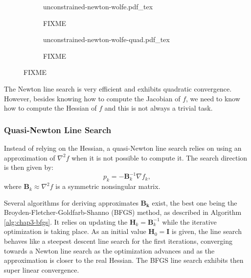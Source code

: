 \begin{figure}
  \centering
  \begin{subfigure}{0.4\columnwidth}
    \centering
        {\def\svgwidth{\linewidth}
          {\footnotesize
            
                       {unconstrained-newton-wolfe.pdf_tex}
          }
        }
        \caption{FIXME}
        \label{fig:chap3-unconstrained-newton-wolfe-a}
  \end{subfigure}
  \begin{subfigure}{0.4\columnwidth}
    \centering
        {\def\svgwidth{\linewidth}
          {\footnotesize
            
                       {unconstrained-newton-wolfe-quad.pdf_tex}
          }
        }
        \caption{FIXME}
        \label{fig:chap3-unconstrained-newton-wolfe-quad}
  \end{subfigure}
  \caption{FIXME}
  \label{fig:chap3-unconstrained-newton-wolfe}
\end{figure}

The Newton line search is very efficient and exhibits quadratic
convergence. However, besides knowing how to compute the Jacobian of
$f$, we need to know how to compute the Hessian of $f$ and this is not
always a trivial task.

\subsubsection{Quasi-Newton Line Search}
\label{subsubsec:chap3-quasi-newton-line-search}

Instead of relying on the Hessian, a quasi-Newton line search relies
on using an approximation of $\nabla^2 f$ when it is not possible to
compute it. The search direction is then given by:
\begin{equation}
p_k=-\mathbf{B}_k^{-1}\nabla f_k,
\end{equation}
where $\mathbf{B}_k\approx\nabla^2 f$ is a symmetric nonsingular
matrix.

Several algorithms for deriving approximates $\mathbf{B_k}$ exist, the
best one being the Broyden-Fletcher-Goldfarb-Shanno (BFGS) method, as
described in Algorithm \ref{alg:chap3-bfgs}. It relies on updating the
$\mathbf{H}_k = \mathbf{B}_k^{-1}$ while the iterative optimization is
taking place. As an initial value $\mathbf{H}_0=\mathbf{I}$ is given,
the line search behaves like a steepest descent line search for the
first iterations, converging towards a Newton line search as the
optimization advances and as the approximation is closer to the real
Hessian. The BFGS line search exhibits then super linear convergence.

